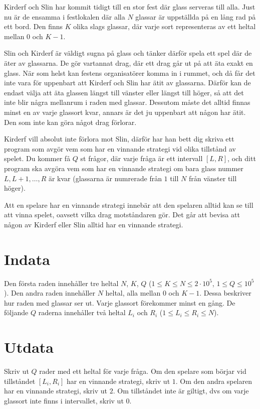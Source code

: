 Kirderf och Slin har kommit tidigt till en stor fest där glass serveras till alla.
Just nu är de ensamma i festlokalen där alla $N$ glassar är uppställda på en lång rad på ett bord.
Den finns $K$ olika slags glassar, där varje sort representeras av ett heltal mellan $0$ och $K-1$.

Slin och Kirderf är väldigt sugna på glass och tänker därför spela ett spel där de äter av glassarna.
De gör vartannat drag, där ett drag går ut på att äta exakt en glass.
När som helst kan festens organisatörer komma in i rummet, och då får det inte vara för
uppenbart att Kirderf och Slin har ätit av glassarna. Därför kan de endast välja att
äta glassen längst till vänster eller längst till höger, så att det inte blir några mellanrum
i raden med glassar. Dessutom måste det alltid finnas minst en av varje glassort kvar,
annars är det ju uppenbart att någon har ätit. Den som inte kan göra något drag förlorar.

Kirderf vill absolut inte förlora mot Slin, därför har han bett dig skriva ett program som avgör vem som har en vinnande
strategi vid olika tillstånd av spelet. Du kommer få $Q$ st frågor, där varje fråga är ett intervall $[L,R]$, och 
ditt program ska avgöra vem som har en vinnande strategi om bara glass nummer $L, L+1, \dots, R$ är kvar (glassarna
är numrerade från $1$ till $N$ från vänster till höger).

Att en spelare har en vinnande strategi innebär att den spelaren alltid kan se till att vinna spelet,
oavsett vilka drag motståndaren gör. Det går att bevisa att någon av Kirderf eller Slin alltid har en vinnande strategi.

\section*{Indata}
Den första raden innehåller tre heltal $N$, $K$, $Q$ ($1 \le K \le N \le 2 \cdot 10^5$, $1 \le Q \le 10^5$).
Den andra raden innehåller $N$ heltal, alla mellan $0$ och $K-1$.
Dessa beskriver hur raden med glassar ser ut. Varje glassort förekommer minst en gång.
De följande $Q$ raderna innehåller två heltal $L_i$ och $R_i$ ($1 \le L_i \le R_i \le N$).


\section*{Utdata}
Skriv ut $Q$ rader med ett heltal för varje fråga. Om den spelare som börjar vid tillståndet $[L_i, R_i]$ har en 
vinnande strategi, skriv ut $1$. Om den andra spelaren har en vinnande strategi, skriv ut $2$. Om tillståndet inte 
är giltigt, dvs om varje glassort inte finns i intervallet, skriv ut $0$.

